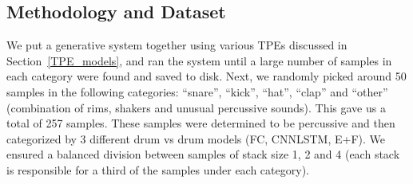 \documentclass[\main/thesis.tex]{subfiles}
\begin{document}
\begin{table}[htbp]
\caption{\label{kappa_table_TPE}Table of Fleiss' kappa coefficients to measure the degree of agreement between persons (HvH) and various TPE models: persons with FC model (H+FC), persons with CNNLSTM model, persons with all models (H+E/F), and between the 3 models. \enquote{Drop Rule} column indicates if any samples were dropped. We show the measurements after dropping samples if they are deemed bad by either or both responders. We also show measurements after dropping the \enquote{other} category along with samples deemed bad by either responder. }
\end{table}

 
 \subsection{Methodology and Dataset}
  We put a generative system together using various TPEs discussed in Section~\ref{TPE_models}, and ran the system until a large number of samples in each category were found and saved to disk. Next, we randomly picked around 50 samples in the following categories: \enquote{snare}, \enquote{kick}, \enquote{hat}, \enquote{clap} and \enquote{other} (combination of rims, 
shakers and unusual percussive sounds). This gave us a total of 257 samples. These samples were determined to be percussive and then categorized by 3 different drum vs drum models (FC, CNNLSTM, E+F). We ensured a balanced division between samples of stack size 1, 2 and 4 (each stack is responsible for a third of the samples under each category).
\end{document}
